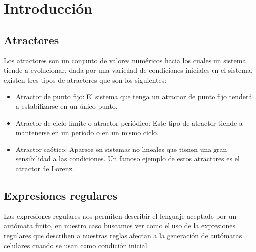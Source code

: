 \documentclass[11pt]{article}
\begin{document}
	\newpage
	
	\section{Introducción}
		\subsection{Atractores}
		Los atractores son un conjunto de valores numéricos hacia los cuales un sistema tiende a evolucionar, dada por una variedad de condiciones iniciales en el sistema, existen tres tipos de atractores que son los siguientes:
		 \begin{itemize}
    		 \item Atractor de punto fijo: El sistema que tenga un atractor de punto fijo tenderá a estabilizarse en un único punto.
		    \item Atractor de ciclo límite o atractor periódico: Este tipo de atractor tiende a mantenerse en un periodo o en un mismo ciclo.
		    \item Atractor caótico: Aparece en sistemas no lineales que tienen una gran sensibilidad a las condiciones. Un famoso ejemplo de estos atractores es el atractor de Lorenz.
		\end{itemize}\par
		\subsection{Expresiones regulares}		
		Las expresiones regulares nos permiten describir el lenguaje aceptado por un autómata finito, en nuestro caso buscamos ver como el uso de la expresiones regulares que describen a nuestras reglas afectan a la generación de autómatas celulares cuando se usan como condición inicial.
\end{document}
